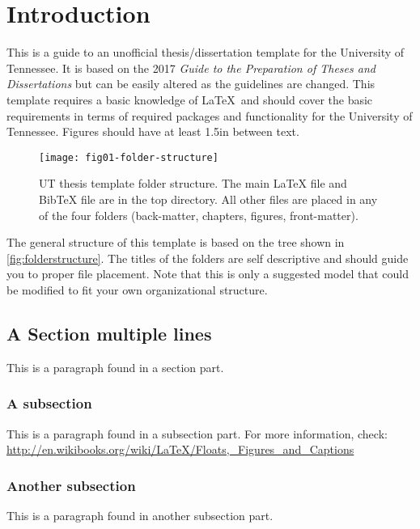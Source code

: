 \chapter{Introduction} \label{chapter1}

\tab This is a guide to an unofficial thesis/dissertation template
for the University of Tennessee.
It is based on the 2017 \textit{Guide to the Preparation of Theses and Dissertations}
but can be easily altered as the guidelines are changed.
This template requires a basic knowledge of \LaTeX\ and should cover
the basic requirements in terms of required packages and functionality
for the University of Tennessee.
Figures should have at least 1.5in between text.

\begin{figure}[!htb]
    \Centering
    \texttt{[image: fig01-folder-structure]}
    \caption[UT thesis template folder structure]{UT thesis template folder structure.
        The main LaTeX file and BibTeX file are in the top directory.
        All other files are placed in any of the four folders
        (back-matter, chapters, figures, front-matter).}
    \label{fig:folderstructure}
\end{figure}

\tab The general structure of this template is based on the tree shown in
\autoref{fig:folderstructure}.
The titles of the folders are self descriptive
and should guide you to proper file placement.
Note that this is only a suggested model that could be
modified to fit your own organizational structure.

\section{A Section multiple lines} \label{asection}
This is a paragraph found in a section part.

\subsection{A subsection}
This is a paragraph found in a subsection part.
For more information, check:
\url{http://en.wikibooks.org/wiki/LaTeX/Floats,_Figures_and_Captions}

\subsection{Another subsection}
This is a paragraph found in another subsection part.

